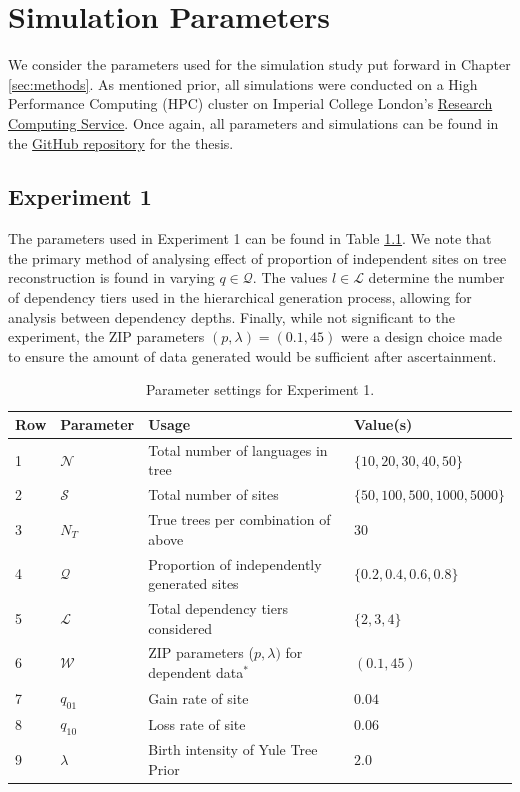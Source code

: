 \chapter{Simulation Parameters}
\label{app:simulationparameters}

We consider the parameters used for the simulation study put forward in Chapter \ref{sec:methods}. As mentioned prior, all simulations were conducted on a High Performance Computing (HPC) cluster on Imperial College London's \hyperlink{https://www.imperial.ac.uk/admin-services/ict/self-service/research-support/rcs/}{Research Computing Service}. Once again, all parameters and simulations can be found in the \hyperlink{https://github.com/jaamestaay/M4R}{GitHub repository} for the thesis.

\section{Experiment 1}
The parameters used in Experiment 1 can be found in Table \ref{tab:exp1para}. We note that the primary method of analysing effect of proportion of independent sites on tree reconstruction is found in varying $q \in \mathcal{Q}$. The values $l \in \mathcal{L}$ determine the number of dependency tiers used in the hierarchical generation process, allowing for analysis between dependency depths. Finally, while not significant to the experiment, the ZIP parameters $(p, \lambda) = (0.1, 45)$ were a design choice made to ensure the amount of data generated would be sufficient after ascertainment. 


\begin{table}[htbp]
\centering
\label{tab:experiment1_parameters}
\begin{tabular}{llll}
\hline
Row & Parameter & Usage & Value(s) \\
\hline
1 & $\mathcal{N}$ & Total number of languages in tree & $\{10,20,30,40,50\}$ \\
2 & $\mathcal{S}$ & Total number of sites & $\{50,100,500,1000,5000\}$ \\
3 & $N_T$ & True trees per combination of above& $30$ \\
4 & $\mathcal{Q}$ & Proportion of independently generated sites  & $\{0.2,0.4,0.6,0.8\}$ \\
5 & $\mathcal{L}$ & Total dependency tiers considered & $\{2,3,4\}$ \\
6 & $\mathcal{W}$ & ZIP parameters ($p, \lambda)$ for dependent data$^*$ & $(0.1,45)$ \\
7 & $q_{01}$ & Gain rate of site & $0.04$ \\
8 & $q_{10}$ & Loss rate of site &$0.06$ \\
9 & $\lambda$ & Birth intensity of Yule Tree Prior & $2.0$ \\
\hline
\end{tabular}
\caption{Parameter settings for Experiment 1.}
\label{tab:exp1para}
\end{table}

